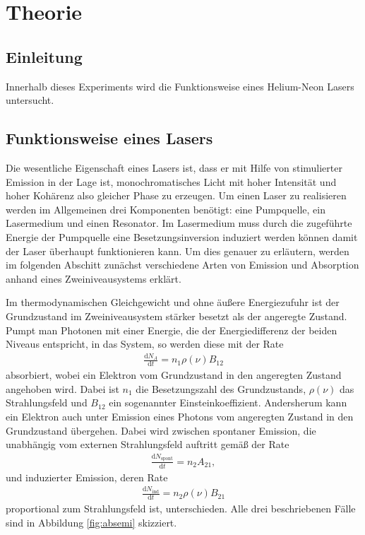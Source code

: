 \section{Theorie}
\label{sec:Theorie}

\subsection{Einleitung}

Innerhalb dieses Experiments wird die Funktionsweise eines Helium-Neon Lasers untersucht.


\subsection{Funktionsweise eines Lasers}

Die wesentliche Eigenschaft eines Lasers ist, dass er mit Hilfe von stimulierter
Emission in der Lage ist, monochromatisches Licht mit hoher Intensität und
hoher Kohärenz also gleicher Phase zu erzeugen.
Um einen Laser zu realisieren werden im Allgemeinen drei Komponenten benötigt:
eine Pumpquelle, ein Lasermedium und einen Resonator. Im Lasermedium muss durch die zugeführte
Energie der Pumpquelle eine Besetzungsinversion induziert werden können
damit der Laser überhaupt funktionieren kann. Um dies genauer zu erläutern,
werden im folgenden Abschitt zunächst verschiedene Arten von Emission und Absorption
anhand eines Zweiniveausystems erklärt.

Im thermodynamischen Gleichgewicht und ohne äußere Energiezufuhr ist der Grundzustand im
Zweiniveausystem stärker besetzt als der angeregte Zustand. Pumpt man Photonen mit einer Energie,
die der Energiedifferenz der beiden Niveaus entspricht, in das System, so werden diese mit der Rate
\begin{align}
  \frac{\mathrm{d}{N}_A}{\mathrm{d}t} = n_1 \rho(\nu) B_{12}
\end{align}
absorbiert, wobei ein Elektron vom Grundzustand in den angeregten Zustand angehoben wird. Dabei ist $n_1$
die Besetzungszahl des Grundzustands, $\rho(\nu)$ das Strahlungsfeld und $B_{12}$ ein sogenannter
Einsteinkoeffizient. Andersherum kann ein Elektron auch unter Emission eines Photons vom angeregten
Zustand in den Grundzustand übergehen. Dabei wird zwischen spontaner Emission, die unabhängig vom
externen Strahlungsfeld auftritt gemäß der Rate
\begin{align}
  \frac{\mathrm{d}{N}_\text{spont}}{\mathrm{d}t} = n_2 A_{21},
\end{align}
und induzierter Emission, deren Rate
\begin{align}
  \frac{\mathrm{d}{N}_\text{ind}}{\mathrm{d}t} = n_2 \rho(\nu) B_{21}
\end{align}
proportional zum Strahlungsfeld ist, unterschieden. Alle drei beschriebenen Fälle sind in Abbildung
\ref{fig:absemi} skizziert.

